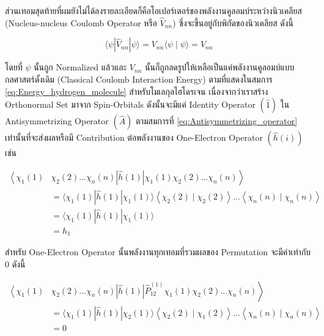 ส่วนเทอมสุดท้ายที่ผมยังไม่ได้ลงรายละเอียดก็คือโอเปอร์เตอร์ของพลังงานคูลอมบ์ระหว่างนิวเคลียส (Nucleus-nucleus Coulomb Operator หรือ
$\hat{V}_{n n}$) ซึ่งจะขึ้นอยู่กับพิกัดของนิวเคลียส ดังนี้

\begin{equation}
  \langle\psi|\hat{V}_{n n}| \psi\rangle
  = V_{n n}\langle\psi \mid \psi\rangle
  = V_{n n}
\end{equation}

\noindent โดยที่ $\psi$ นั้นถูก Normalized แล้วและ $V_{n n}$ นั้นก็ถูกลดรูปให้เหลือเป็นแค่พลังงานคูลอมบ์แบบกลศาสตร์ดั้งเดิม
(Classical Coulomb Interaction Energy) ตามที่แสดงในสมการ \eqref{eq:Energy_hydrogen_molecule} สำหรับโมเลกุลไฮโดรเจน
เนื่องจากว่าเราสร้าง Orthonormal Set มาจาก Spin-Orbitals ดังนั้นจะมีแค่ Identity Operator $(\hat{1})$ ใน Antisymmetrizing
Operator $(\hat{A})$ ตามสมการที่ \eqref{eq:Antisymmetrizing_operator} เท่านั้นที่จะส่งผลหรือมี Contribution
ต่อพลังงานของ One-Electron Operator $(\hat{h}(i))$ เช่น

\begin{equation}
  \begin{aligned}
    \left\langle \right. \chi_1(1) & \chi_2(2) \dots \chi_n(n)
    |\hat{h}(1)|
    \chi_1(1) \chi_2(2) \dots \chi_n(n) \left. \right\rangle   \\
                                   & = \langle\chi_1(1)
    |\hat{h}(1)|
    \chi_1(1)\rangle\left\langle\chi_2(2) \mid \chi_2(2)\right\rangle
    \dots\left\langle\chi_n(n) \mid \chi_n(n)\right\rangle     \\
                                   & = \langle\chi_1(1)
    |\hat{h}(1)|
    \chi_1(1)\rangle                                           \\
                                   & = h_1
  \end{aligned}
\end{equation}

\noindent สำหรับ One-Electron Operator นั้นพลังงานทุกเทอมที่รวมผลของ Permutation จะมีค่าเท่ากับ 0 ดังนี้

\begin{equation}
  \begin{aligned}
    \left\langle \right. \chi_1(1) & \chi_2(2) \dots \chi_n(n)
    |\hat{h}(1)|
    \hat{P}_{12}^{(1)} \chi_1(1) \chi_2(2) \dots \chi_n(n) \left. \right\rangle \\
                                   & = \langle\chi_1(1)
    |\hat{h}(1)|
    \chi_2(1)\rangle\left\langle\chi_2(2) \mid \chi_1(2)\right\rangle
    \dots\left\langle\chi_n(n) \mid \chi_n(n)\right\rangle                      \\
                                   & = 0
  \end{aligned}
\end{equation}


